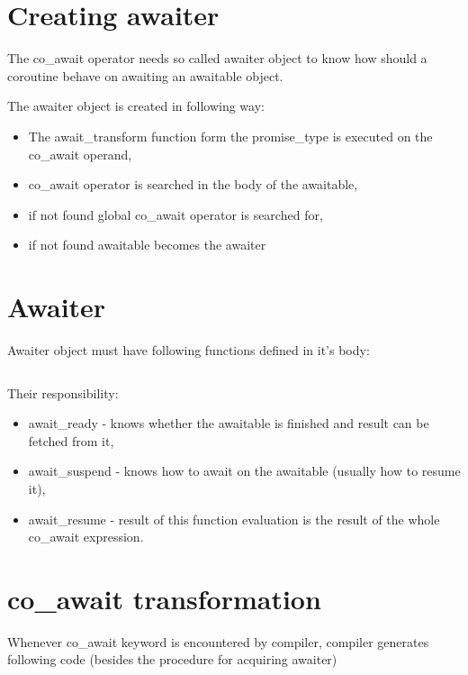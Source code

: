 \documentclass[twoside,twocolumn, 10pt]{article}
\begin{document}
	\section{Creating awaiter}

	The co\_await operator needs so called awaiter object to know
	how should a coroutine behave on awaiting an awaitable object.

	The awaiter object is created in following way:

	\begin{itemize}
		\item The await\_transform function form the
		 promise\_type is executed on the co\_await operand,
		\item co\_await operator is searched in the body of the awaitable,
		\item if not found global co\_await operator is searched for,
		\item if not found awaitable becomes the awaiter
	\end{itemize}

	\section{Awaiter}

	Awaiter object must have following functions defined in it's body:

	\inputminted{c++}{code-examples/theory-custom-coroutine/awaiter.hpp}

	Their responsibility:
	\begin{itemize}
		\item await\_ready - knows whether the awaitable is finished and result can be fetched from it,
		\item await\_suspend - knows how to await on the awaitable (usually how to resume it),
		\item await\_resume - result of this function evaluation is the result of the whole co\_await expression.
	\end{itemize}

	\section{co\_await transformation}

	Whenever co\_await keyword is encountered by compiler, compiler generates following code (besides the procedure for acquiring awaiter)

	\inputminted{c++}{code-examples/theory-custom-coroutine/co-await-transformation.cpp}
\end{document}
